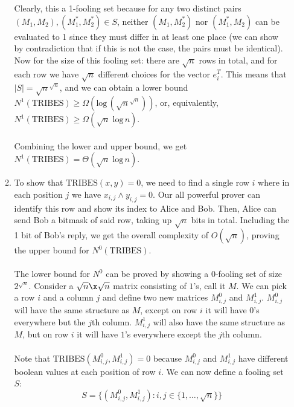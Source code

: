 \documentclass{article}
\begin{document}
\begin{enumerate}
\begin{enumerate}[label=(\alph*)]
                Clearly, this a 1-fooling set because for any two distinct
                pairs $(M_1, M_2), (M_1^*, M_2^*) \in S$, neither $(M_1,
                M_2^*)$ nor $(M_1^*, M_2)$ can be evaluated to 1 since they
                must differ in at least one place (we can show by contradiction
                that if this is not the case, the pairs must be identical). Now
                for the size of this fooling set: there are $\sqrt{n}$ rows in
                total, and for each row we have $\sqrt{n}$ different choices
                for the vector $e_i^T$. This means that $|S| =
                \sqrt{n}^{\sqrt{n}}$, and we can obtain a lower bound
                $N^1(\textrm{TRIBES}) \geq \Omega(\textrm{log}\, \left(
                \sqrt{n}^{\sqrt{n}} \right) )$, or, equivalently,
                $N^1(\textrm{TRIBES}) \geq \Omega(\sqrt{n}\;\textrm{log}\,n)$.
                \\\\
                Combining the lower and upper bound, we get
                $N^1(\textrm{TRIBES}) = \Theta(\sqrt{n}\;\textrm{log}\,n)$.
                \\

            \item To show that $\textrm{TRIBES}(x,y) = 0$, we need to find a
                single row $i$ where in each position $j$ we have $x_{i,j}
                \land y_{i,j} = 0$. Our all powerful prover can identify this
                row and show its index to Alice and Bob. Then, Alice can send
                Bob a bitmask of said row, taking up $\sqrt{n}$ bits in total.
                Including the 1 bit of Bob's reply, we get the overall
                complexity of $O(\sqrt{n})$, proving the upper bound for
                $N^0(\textrm{TRIBES})$.
                \\\\
                The lower bound for $N^0$ can be proved by showing a 0-fooling
                set of size $2^{\sqrt{n}}$. Consider a $\sqrt{n} \x \sqrt{n}$
                matrix consisting of $1$'s, call it $M$. We can pick a row $i$
                and a column $j$ and define two new matrices $M^0_{i,j}$ and
                $M^1_{i,j}$. $M^0_{i,j}$ will have the same structure as $M$,
                except on row $i$ it will have $0$'s everywhere but the $j$th
                column. $M^1_{i,j}$ will also have the same structure as $M$,
                but on row $i$ it will have $1$'s everywhere except the $j$th
                column.
                \\\\
                Note that $\textrm{TRIBES}(M^0_{i,j}, M^1_{i,j}) = 0$ because
                $M^0_{i,j}$ and $M^1_{i,j}$ have different boolean values at
                each position of row $i$. We can now define a fooling set $S$:
                $$ S = \{ (M^0_{i,j}, M^1_{i,j}): i, j \in \{ 1, \ldots,
                \sqrt{n} \}\} $$



\end{enumerate}
\end{enumerate}
\end{document}

